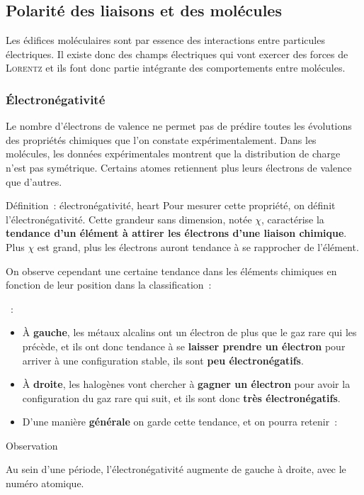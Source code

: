 \documentclass[../main/main.tex]{subfiles}
\begin{document}
\subsection{Polarité des liaisons et des molécules}
Les édifices moléculaires sont par essence des interactions entre particules
électriques. Il existe donc des champs électriques qui vont exercer des forces
de \textsc{Lorentz} et ils font donc partie intégrante des comportements entre
molécules.
\subsubsection{Électronégativité}
Le nombre d'électrons de valence ne permet pas de prédire toutes les évolutions
des propriétés chimiques que l'on constate expérimentalement. Dans les
molécules, les données expérimentales montrent que la distribution de charge
n'est pas symétrique. Certains atomes retiennent plus leurs électrons de valence
que d'autres.
\begin{tdefi}{Définition~: électronégativité, heart}
    Pour mesurer cette propriété, on définit l'électronégativité. Cette grandeur
    sans dimension, notée $\chi$, caractérise la \textbf{tendance d'un élément à
    attirer les électrons d'une liaison chimique}. Plus $\chi$ est grand, plus
    les électrons auront tendance à se rapprocher de l'élément.
\end{tdefi}
On observe cependant une certaine tendance dans les éléments chimiques en
fonction de leur position dans la classification~:
\begin{itemize}
    ~:
        \begin{itemize}
            \item À \textbf{gauche}, les métaux alcalins ont un électron de plus
                que le gaz rare qui les précède, et ils ont donc tendance à se
                \textbf{laisser prendre un électron} pour arriver à une
                configuration stable, ils sont \textbf{peu électronégatifs}.
            \item À \textbf{droite}, les halogènes vont chercher à
                \textbf{gagner un électron} pour avoir la configuration du gaz
                rare qui suit, et ils sont donc \textbf{très électronégatifs}.
            \item D'une manière \textbf{générale} on garde cette tendance, et on
                pourra retenir~:
        \end{itemize}
\end{itemize}
\begin{tror}{Observation}
    \begin{center}
        Au sein d'une période, l'électronégativité augmente de gauche à droite,
        avec le numéro atomique.
    \end{center}
\end{tror}
\end{document}
